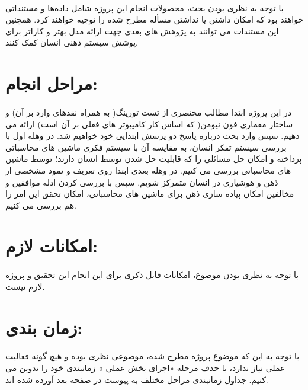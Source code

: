 \documentclass{report}
\begin{document}
\paragraph{} \hspace{0pt}
با توجه به نظری بودن بحث، محصولات انجام این پروژه شامل داده‌ها و مستنداتی خواهند بود که امکان داشتن یا نداشتن مسأله مطرح شده را توجیه خواهند کرد. همچنین این مستندات می توانند به پژوهش های بعدی جهت ارائه مدل بهتر و کاراتر برای پوشش سیستم ذهنی انسان کمک کنند.

\section*{مراحل انجام:}

\paragraph{} \hspace{0pt}
در این پروژه ابتدا مطالب مختصری از تست تورینگ( به همراه نقدهای وارد بر آن) و ساختار معماری فون نیومن( که اساس کار کامپیوتر های فعلی بر آن است) ارائه می دهیم. سپس وارد بحث درباره پاسخ دو پرسش ابتدایی خود خواهیم شد.
در وهله اول با بررسی سیستم تفکر انسان، به مقایسه آن با سیستم فکری ماشین های محاسباتی پرداخته و امکان حل مسائلی را که قابلیت حل شدن توسط انسان دارند؛ توسط ماشین های محاسباتی بررسی می کنیم.
در وهله بعدی ابتدا روی تعریف و نمود مشخصی از ذهن و هوشیاری در انسان متمرکز شویم. سپس با بررسی کردن ادله موافقین و مخالفین امکان پیاده سازی ذهن برای ماشین های محاسباتی، امکان تحقق این امر را هم بررسی می کنیم.

\section*{امکانات لازم:}

\paragraph{} \hspace{0pt}
با توجه به نظری بودن موضوع، امکانات قابل ذکری برای این انجام این تحقیق و پروژه لازم نیست.
\section*{زمان بندی:}

\paragraph{} \hspace{0pt}
با توجه به این که موضوع پروژه مطرح شده، موضوعی نظری بوده و هیچ گونه فعالیت عملی نیاز ندارد، با حذف مرحله «اجرای بخش عملی » زمانبندی خود را تدوین می کنیم. جداول زمانبندی مراحل مختلف به پیوست در صفحه بعد آورده شده اند.
\end{document}
